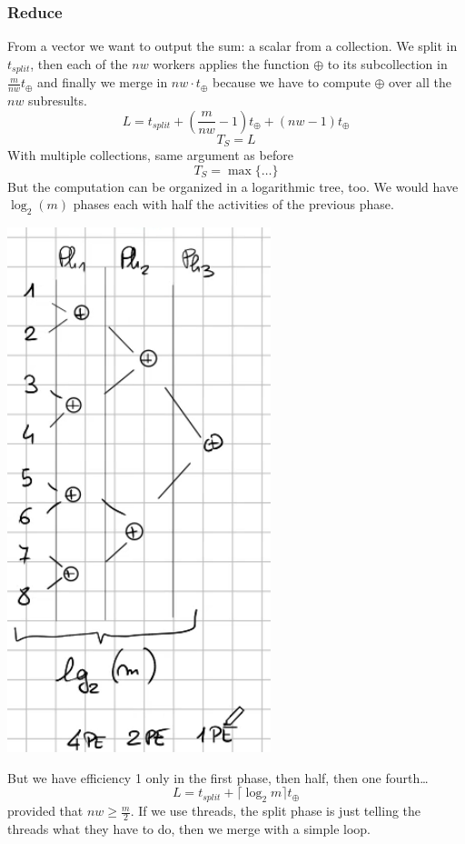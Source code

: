 \documentclass[10pt]{report}
\begin{document}
\subsubsection{Reduce}
From a vector we want to output the sum: a scalar from a collection. We split in $t_{split}$, then each of the $nw$ workers applies the function $\oplus$ to its subcollection in $\frac{m}{nw}t_\oplus$ and finally we merge in $nw\cdot t_\oplus$ because we have to compute $\oplus$ over all the $nw$ subresults.
$$L=t_{split} + \left(\frac{m}{nw}-1\right)t_\oplus+(nw-1)t_\oplus$$
$$T_S = L$$
With multiple collections, same argument as before
$$T_S = \max\{\ldots\}$$
But the computation can be organized in a logarithmic tree, too. We would have $\log_2(m)$ phases each with half the activities of the previous phase.\begin{center}
	\includegraphics[scale=0.5]{6.png}
\end{center}
But we have efficiency 1 only in the first phase, then half, then one fourth\ldots
$$L=t_{split}+\lceil\log_2 m\rceil t_\oplus$$
provided that $nw \geq \frac{m}{2}$. If we use threads, the split phase is just telling the threads what they have to do, then we merge with a simple loop.
\end{document}

